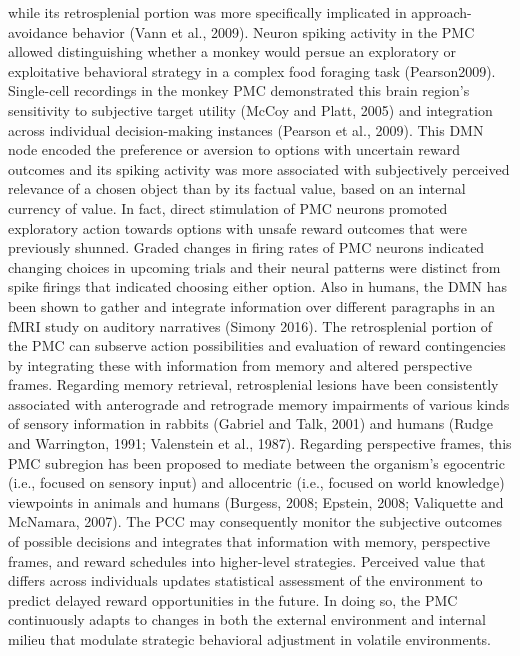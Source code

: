 \documentclass{article} %
\begin{document}
while its retrosplenial portion was
more specifically implicated in approach-avoidance behavior (Vann et al., 2009).
Neuron spiking activity in the PMC allowed distinguishing
whether a monkey would persue an exploratory or exploitative
behavioral strategy in a complex food foraging task (Pearson2009).
Single-cell recordings in the monkey PMC
demonstrated this brain region's sensitivity to
subjective target utility (McCoy and Platt, 2005) and integration
across individual decision-making instances (Pearson et al., 2009).
This DMN node encoded the
preference or aversion to options with uncertain reward outcomes
and its spiking activity was more associated with
subjectively perceived relevance of a chosen object
than by its factual value, based on an internal currency of value.
In fact, direct stimulation of PMC neurons
promoted exploratory action towards options
with unsafe reward outcomes that were previously shunned.
Graded changes in firing rates of PMC neurons
indicated changing choices in upcoming trials and their neural patterns were
distinct from spike firings that indicated choosing either option.
Also in humans, 
the DMN has been shown to gather and integrate information
over different paragraphs in an fMRI study on auditory narratives (Simony 2016).
%
The retrosplenial portion of the PMC can subserve action possibilities
and evaluation of reward contingencies by integrating these with
information from memory and altered perspective frames.
Regarding memory retrieval, retrosplenial lesions have been
consistently associated with anterograde and retrograde memory impairments
of various kinds of sensory information
in rabbits (Gabriel and Talk, 2001) and humans
(Rudge and Warrington, 1991; Valenstein et al., 1987).
Regarding perspective frames, this PMC subregion has been
proposed to mediate between the organism's egocentric
(i.e., focused on sensory input) and
allocentric (i.e., focused on world knowledge) viewpoints
in animals and humans
(Burgess, 2008; Epstein, 2008; Valiquette and McNamara, 2007).
%
The PCC may consequently monitor the subjective outcomes
of possible decisions and integrates that information
with memory, perspective frames, and
reward schedules into higher-level strategies. 
Perceived value that differs across individuals updates
statistical assessment of the environment
to predict delayed reward opportunities in the future.
In doing so, the PMC continuously adapts to changes
in both the external environment and internal milieu
that modulate strategic behavioral adjustment in volatile environments.
\end{document}
